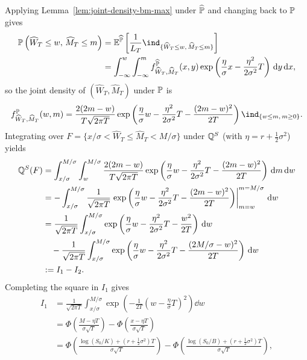 Applying Lemma~\ref{lem:joint-density-bm-max} under $\widehat{\mathbb{P}}$ and changing back to $\mathbb{P}$ gives
\[
\begin{aligned}
    \Prob\left(\widehat{W}_T \le w,\, \widehat{M}_T \le m\right) &= \E^{\widehat{\Prob}}\left[\frac{1}{L_T}\ind_{\{\widehat{W}_T \le w,\, \widehat{M}_T \le m\}}\right] \\
    &= \int_{-\infty}^w \int_{-\infty}^m f^{\widehat{\Prob}}_{\widehat{W}_T, \widehat{M}_T}(x, y)\exp\left(\frac{\eta}{\sigma}x - \frac{\eta^2}{2\sigma^2}T\right)\dd y\dd x,
\end{aligned}
\]
so the joint density of $(\widehat{W}_T, \widehat{M}_T)$ under $\mathbb{P}$ is
\[
f^{\Prob}_{\widehat{W}_T, \widehat{M}_T}(w, m) = \frac{2(2m - w)}{T\sqrt{2\pi T}}\exp\left(\frac{\eta}{\sigma}w - \frac{\eta^2}{2\sigma^2}T - \frac{(2m - w)^2}{2T}\right)\ind_{\{w \le m,\, m \ge 0\}}.
\]
Integrating over $F = \{x/\sigma < \widehat{W}_T \le \widehat{M}_T < M/\sigma\}$ under $\mathbb{Q}^S$ (with $\eta = r + \frac{1}{2}\sigma^2$) yields
\[
\begin{aligned}
    \mathbb{Q}^S(F) &= \int_{x/\sigma}^{M/\sigma}\int_w^{M/\sigma} \frac{2(2m - w)}{T\sqrt{2\pi T}}\exp\left(\frac{\eta}{\sigma}w - \frac{\eta^2}{2\sigma^2}T - \frac{(2m - w)^2}{2T}\right)\,\mathrm{d} m\,\mathrm{d} w \\
    &= -\int_{x/\sigma}^{M/\sigma} \frac{1}{\sqrt{2\pi T}}\left.\exp\left(\frac{\eta}{\sigma}w - \frac{\eta^2}{2\sigma^2}T - \frac{(2m - w)^2}{2T}\right)\right|_{m=w}^{m=M/\sigma}\,\mathrm{d} w \\
    &= \frac{1}{\sqrt{2\pi T}}\int_{x/\sigma}^{M/\sigma} \exp\left(\frac{\eta}{\sigma}w - \frac{\eta^2}{2\sigma^2}T - \frac{w^2}{2T}\right)\,\mathrm{d} w \\
    &\quad - \frac{1}{\sqrt{2\pi T}}\int_{x/\sigma}^{M/\sigma} \exp\left(\frac{\eta}{\sigma}w - \frac{\eta^2}{2\sigma^2}T - \frac{(2M/\sigma - w)^2}{2T}\right)\,\mathrm{d} w \\
    &:= I_1 - I_2.
\end{aligned}
\]
Completing the square in $I_1$ gives
\[
\begin{aligned}
    I_1 &= \frac{1}{\sqrt{2\pi T}}\int_{x/\sigma}^{M/\sigma} \exp\left(-\frac{1}{2T}\left(w - \frac{\eta}{\sigma}T\right)^2\right)\dd w \\
        &= \Phi\left(\frac{M - \eta T}{\sigma\sqrt{T}}\right) - \Phi\left(\frac{x - \eta T}{\sigma\sqrt{T}}\right) \\
        &= \Phi\left(\frac{\log(S_0/K) + \left(r + \frac{1}{2}\sigma^2\right)T}{\sigma\sqrt{T}}\right) - \Phi\left(\frac{\log(S_0/B) + \left(r + \frac{1}{2}\sigma^2\right)T}{\sigma\sqrt{T}}\right),
\end{aligned}
\]
